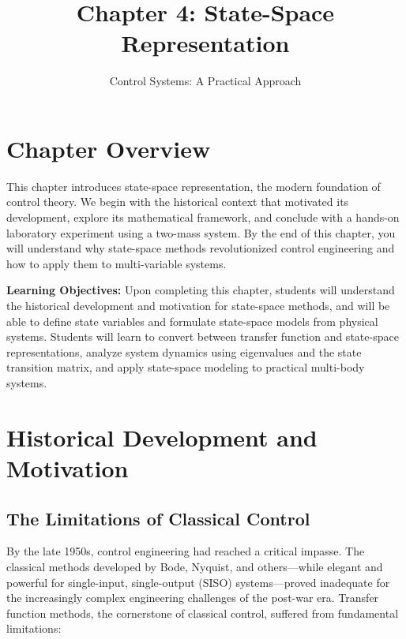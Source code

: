 
\title{Chapter 4: State-Space Representation}
\author{Control Systems: A Practical Approach}
\maketitle

\section*{Chapter Overview}

This chapter introduces state-space representation, the modern foundation of control theory. We begin with the historical context that motivated its development, explore its mathematical framework, and conclude with a hands-on laboratory experiment using a two-mass system. By the end of this chapter, you will understand why state-space methods revolutionized control engineering and how to apply them to multi-variable systems.

\vspace{1em}
\noindent\textbf{Learning Objectives:}
Upon completing this chapter, students will understand the historical development and motivation for state-space methods, and will be able to define state variables and formulate state-space models from physical systems. Students will learn to convert between transfer function and state-space representations, analyze system dynamics using eigenvalues and the state transition matrix, and apply state-space modeling to practical multi-body systems.

\section{Historical Development and Motivation}

\subsection{The Limitations of Classical Control}

By the late 1950s, control engineering had reached a critical impasse. The classical methods developed by Bode, Nyquist, and others---while elegant and powerful for single-input, single-output (SISO) systems---proved inadequate for the increasingly complex engineering challenges of the post-war era. Transfer function methods, the cornerstone of classical control, suffered from fundamental limitations:

